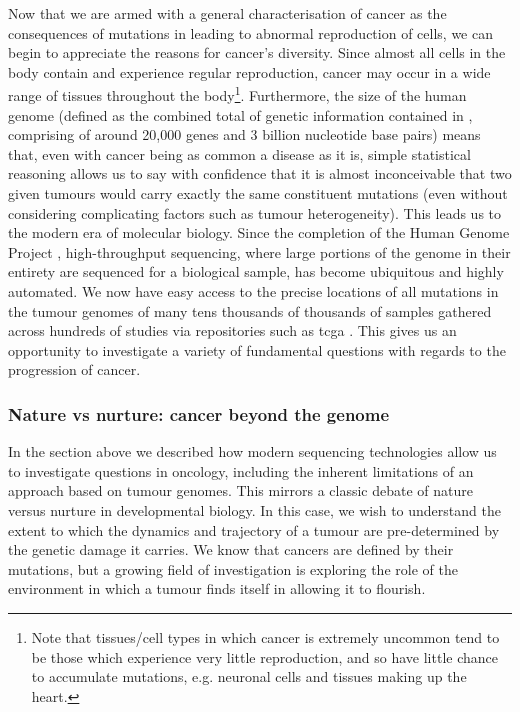 \documentclass[thesis.tex]{subfiles}
\begin{document}
Now that we are armed with a general characterisation of cancer as the consequences of mutations in  leading to abnormal reproduction of cells, we can begin to appreciate the reasons for cancer's diversity. Since almost all cells in the body contain  and experience regular reproduction, cancer may occur in a wide range of tissues throughout the body\footnote{Note that tissues/cell types in which cancer is extremely uncommon tend to be those which experience very little reproduction, and so have little chance to accumulate mutations, e.g. neuronal cells and tissues making up the heart.}. Furthermore, the size of the human genome (defined as the combined total of genetic information contained in , comprising of around 20,000 genes and 3 billion nucleotide base pairs) means that, even with cancer being as common a disease as it is, simple statistical reasoning allows us to say with confidence that it is almost inconceivable that two given tumours would carry exactly the same constituent mutations (even without considering complicating factors such as tumour heterogeneity). This leads us to the modern era of molecular biology. Since the completion of the Human Genome Project \citep{lander_initial_2001}, high-throughput sequencing, where large portions of the genome in their entirety are sequenced for a biological sample, has become ubiquitous and highly automated. We now have easy access to the precise locations of all mutations in the tumour genomes of many tens thousands of thousands of samples gathered across hundreds of studies via repositories such as \gls{tcga} \citep{weinstein_cancer_2013}. This gives us an opportunity to investigate a variety of fundamental questions with regards to the progression of cancer. 

\subsubsection{Nature vs nurture: cancer beyond the genome}
In the section above we described how modern sequencing technologies allow us to investigate questions in oncology, including the inherent limitations of an approach based on tumour genomes. This mirrors a classic debate of nature versus nurture in developmental biology. In this case, we wish to understand the extent to which the dynamics and trajectory of a tumour are pre-determined by the genetic damage it carries. We know that cancers are defined by their mutations, but a growing field of investigation is exploring the role of the environment in which a tumour finds itself in allowing it to flourish. 
\end{document}
